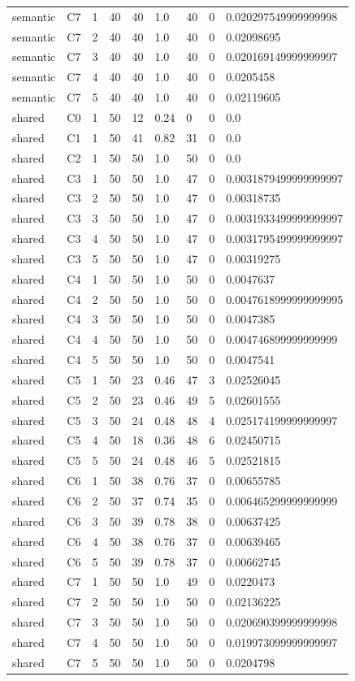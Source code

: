 \begin{tabular}{lllllllll}
semantic & C7 & 1 & 40 & 40 & 1.0 & 40 & 0 & 0.020297549999999998 \\
semantic & C7 & 2 & 40 & 40 & 1.0 & 40 & 0 & 0.02098695 \\
semantic & C7 & 3 & 40 & 40 & 1.0 & 40 & 0 & 0.020169149999999997 \\
semantic & C7 & 4 & 40 & 40 & 1.0 & 40 & 0 & 0.0205458 \\
semantic & C7 & 5 & 40 & 40 & 1.0 & 40 & 0 & 0.02119605 \\
shared & C0 & 1 & 50 & 12 & 0.24 & 0 & 0 & 0.0 \\
shared & C1 & 1 & 50 & 41 & 0.82 & 31 & 0 & 0.0 \\
shared & C2 & 1 & 50 & 50 & 1.0 & 50 & 0 & 0.0 \\
shared & C3 & 1 & 50 & 50 & 1.0 & 47 & 0 & 0.0031879499999999997 \\
shared & C3 & 2 & 50 & 50 & 1.0 & 47 & 0 & 0.00318735 \\
shared & C3 & 3 & 50 & 50 & 1.0 & 47 & 0 & 0.0031933499999999997 \\
shared & C3 & 4 & 50 & 50 & 1.0 & 47 & 0 & 0.0031795499999999997 \\
shared & C3 & 5 & 50 & 50 & 1.0 & 47 & 0 & 0.00319275 \\
shared & C4 & 1 & 50 & 50 & 1.0 & 50 & 0 & 0.0047637 \\
shared & C4 & 2 & 50 & 50 & 1.0 & 50 & 0 & 0.0047618999999999995 \\
shared & C4 & 3 & 50 & 50 & 1.0 & 50 & 0 & 0.0047385 \\
shared & C4 & 4 & 50 & 50 & 1.0 & 50 & 0 & 0.004746899999999999 \\
shared & C4 & 5 & 50 & 50 & 1.0 & 50 & 0 & 0.0047541 \\
shared & C5 & 1 & 50 & 23 & 0.46 & 47 & 3 & 0.02526045 \\
shared & C5 & 2 & 50 & 23 & 0.46 & 49 & 5 & 0.02601555 \\
shared & C5 & 3 & 50 & 24 & 0.48 & 48 & 4 & 0.025174199999999997 \\
shared & C5 & 4 & 50 & 18 & 0.36 & 48 & 6 & 0.02450715 \\
shared & C5 & 5 & 50 & 24 & 0.48 & 46 & 5 & 0.02521815 \\
shared & C6 & 1 & 50 & 38 & 0.76 & 37 & 0 & 0.00655785 \\
shared & C6 & 2 & 50 & 37 & 0.74 & 35 & 0 & 0.006465299999999999 \\
shared & C6 & 3 & 50 & 39 & 0.78 & 38 & 0 & 0.00637425 \\
shared & C6 & 4 & 50 & 38 & 0.76 & 37 & 0 & 0.00639465 \\
shared & C6 & 5 & 50 & 39 & 0.78 & 37 & 0 & 0.00662745 \\
shared & C7 & 1 & 50 & 50 & 1.0 & 49 & 0 & 0.0220473 \\
shared & C7 & 2 & 50 & 50 & 1.0 & 50 & 0 & 0.02136225 \\
shared & C7 & 3 & 50 & 50 & 1.0 & 50 & 0 & 0.020690399999999998 \\
shared & C7 & 4 & 50 & 50 & 1.0 & 50 & 0 & 0.019973099999999997 \\
shared & C7 & 5 & 50 & 50 & 1.0 & 50 & 0 & 0.0204798 \\
\end{tabular}